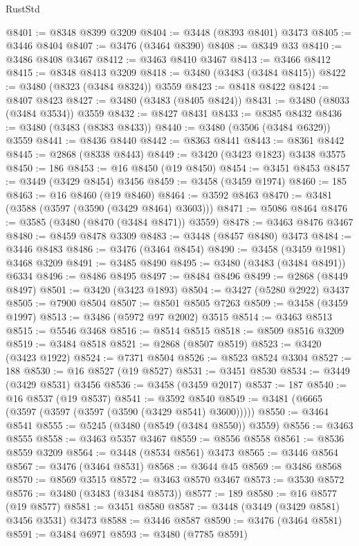 \begin{lexlean}{RustStd}
\begin{coremodule}
{\begin{coremodule}
{{{{{{{{{{{{{{{{{{{{{{{{{{{{{{{{{{{{{{{{{{{{{{{{{{{{{{{{{{{{{{{{{{{{{{{{{{{{{{{{{{{{{@8401 := @8348 @8399 @3209
@8404 := @3448 (@8393 @8401) @3473
@8405 := @3446 @8404
@8407 := @3476 (@3464 @8390)
@8408 := @8349 @33
@8410 := @3486 @8408 @3467
@8412 := @3463 @8410 @3467
@8413 := @3466 @8412
@8415 := @8348 @8413 @3209
@8418 := @3480 (@3483 (@3484 @8415))
@8422 := @3480 (@8323 (@3484 @8324)) @3559
@8423 := @8418 @8422
@8424 := @8407 @8423
@8427 := @3480 (@3483 (@8405 @8424))
@8431 := @3480 (@8033 (@3484 @3534)) @3559
@8432 := @8427 @8431
@8433 := @8385 @8432
@8436 := @3480 (@3483 (@8383 @8433))
@8440 := @3480 (@3506 (@3484 @6329)) @3559
@8441 := @8436 @8440
@8442 := @8363 @8441
@8443 := @8361 @8442
@8445 := @2868 (@8338 @8443)
@8449 := @3420 (@3423 @1823) @3438 @3575
@8450 := 186
@8453 := @16 @8450 (@19 @8450)
@8454 := @3451 @8453
@8457 := @3449 (@3429 @8454) @3456
@8459 := @3458 (@3459 @1974)
@8460 := 185
@8463 := @16 @8460 (@19 @8460)
@8464 := @3592 @8463
@8470 := @3481 (@3588 (@3597 (@3590 (@3429 @8464) @3603)))
@8471 := @5086 @8464
@8476 := @3585 (@3480 (@8470 (@3484 @8471)) @3559)
@8478 := @3463 @8476 @3467
@8480 := @8459 @8478 @3309
@8483 := @3448 (@8457 @8480) @3473
@8484 := @3446 @8483
@8486 := @3476 (@3464 @8454)
@8490 := @3458 (@3459 @1981) @3468 @3209
@8491 := @3485 @8490
@8495 := @3480 (@3483 (@3484 @8491)) @6334
@8496 := @8486 @8495
@8497 := @8484 @8496
@8499 := @2868 (@8449 @8497)
@8501 := @3420 (@3423 @1893)
@8504 := @3427 (@5280 @2922) @3437
@8505 := @7900 @8504
@8507 := @8501 @8505 @7263
@8509 := @3458 (@3459 @1997)
@8513 := @3486 (@5972 @97 @2002) @3515
@8514 := @3463 @8513
@8515 := @5546 @3468
@8516 := @8514 @8515
@8518 := @8509 @8516 @3209
@8519 := @3484 @8518
@8521 := @2868 (@8507 @8519)
@8523 := @3420 (@3423 @1922)
@8524 := @7371 @8504
@8526 := @8523 @8524 @3304
@8527 := 188
@8530 := @16 @8527 (@19 @8527)
@8531 := @3451 @8530
@8534 := @3449 (@3429 @8531) @3456
@8536 := @3458 (@3459 @2017)
@8537 := 187
@8540 := @16 @8537 (@19 @8537)
@8541 := @3592 @8540
@8549 := @3481 (@6665 (@3597 (@3597 (@3597 (@3590 (@3429 @8541) @3600)))))
@8550 := @3464 @8541
@8555 := @5245 (@3480 (@8549 (@3484 @8550)) @3559)
@8556 := @3463 @8555
@8558 := @3463 @5357 @3467
@8559 := @8556 @8558
@8561 := @8536 @8559 @3209
@8564 := @3448 (@8534 @8561) @3473
@8565 := @3446 @8564
@8567 := @3476 (@3464 @8531)
@8568 := @3644 @45
@8569 := @3486 @8568
@8570 := @8569 @3515
@8572 := @3463 @8570 @3467
@8573 := @3530 @8572
@8576 := @3480 (@3483 (@3484 @8573))
@8577 := 189
@8580 := @16 @8577 (@19 @8577)
@8581 := @3451 @8580
@8587 := @3448 (@3449 (@3429 @8581) @3456 @3531) @3473
@8588 := @3446 @8587
@8590 := @3476 (@3464 @8581)
@8591 := @3484 @6971
@8593 := @3480 (@7785 @8591)
}}}}}}}}}}}}}}}}}}}}}}}}}}}}}}}}}}}}}}}}}}}}}}}}}}}}}}}}}}}}}}}}}}}}}}}}}}}}}}}}}}}}}
\end{coremodule}}
\end{coremodule}
\end{lexlean}
